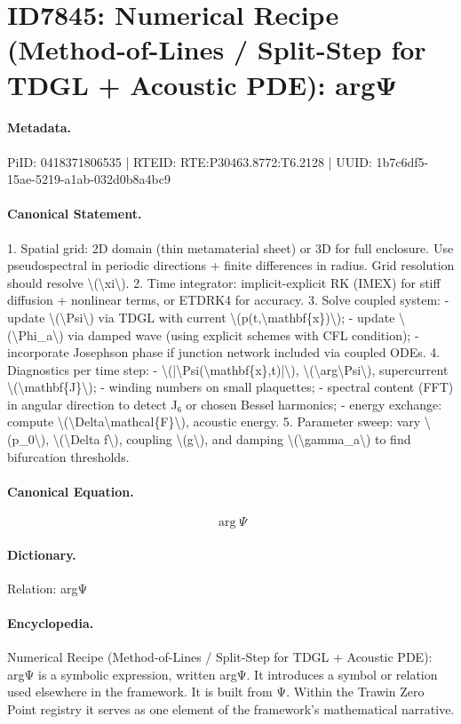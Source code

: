 \section*{ID7845: Numerical Recipe (Method-of-Lines / Split-Step for TDGL + Acoustic PDE): argΨ}
\paragraph{Metadata.}
PiID: 0418371806535 | RTEID: RTE:P30463.8772:T6.2128 | UUID: 1b7c6df5-15ae-5219-a1ab-032d0b8a4bc9

\paragraph{Canonical Statement.}
1. Spatial grid: 2D domain (thin metamaterial sheet) or 3D for full enclosure. Use pseudospectral in periodic directions + finite differences in radius. Grid resolution should resolve \textbackslash{}(\textbackslash{}xi\textbackslash{}). 2. Time integrator: implicit-explicit RK (IMEX) for stiff diffusion + nonlinear terms, or ETDRK4 for accuracy. 3. Solve coupled system: - update \textbackslash{}(\textbackslash{}Psi\textbackslash{}) via TDGL with current \textbackslash{}(p(t,\textbackslash{}mathbf\{x\})\textbackslash{}); - update \textbackslash{}(\textbackslash{}Phi\_a\textbackslash{}) via damped wave (using explicit schemes with CFL condition); - incorporate Josephson phase if junction network included via coupled ODEs. 4. Diagnostics per time step: - \textbackslash{}(|\textbackslash{}Psi(\textbackslash{}mathbf\{x\},t)|\textbackslash{}), \textbackslash{}(\textbackslash{}arg\textbackslash{}Psi\textbackslash{}), supercurrent \textbackslash{}(\textbackslash{}mathbf\{J\}\textbackslash{}); - winding numbers on small plaquettes; - spectral content (FFT) in angular direction to detect J₆ or chosen Bessel harmonics; - energy exchange: compute \textbackslash{}(\textbackslash{}Delta\textbackslash{}mathcal\{F\}\textbackslash{}), acoustic energy. 5. Parameter sweep: vary \textbackslash{}(p\_0\textbackslash{}), \textbackslash{}(\textbackslash{}Delta f\textbackslash{}), coupling \textbackslash{}(g\textbackslash{}), and damping \textbackslash{}(\textbackslash{}gamma\_a\textbackslash{}) to find bifurcation thresholds.

\paragraph{Canonical Equation.}
\[
\arg\Psi
\]

\paragraph{Dictionary.}
Relation: argΨ

\paragraph{Encyclopedia.}
Numerical Recipe (Method-of-Lines / Split-Step for TDGL + Acoustic PDE): argΨ is a symbolic expression, written argΨ. It introduces a symbol or relation used elsewhere in the framework. It is built from Ψ. Within the Trawin Zero Point registry it serves as one element of the framework's mathematical narrative.

